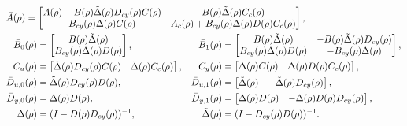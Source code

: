 \documentclass[fleqn,11pt]{article}
\begin{document}
\begin{align*}
    &\bar A(\rho) = \begin{bmatrix}
                A(\rho)+B(\rho)\tilde\Delta(\rho)D_{cy}(\rho)C(\rho) & B(\rho)\tilde\Delta(\rho) C_{c}(\rho)\\
                B_{cy}(\rho)\Delta(\rho)C(\rho) & A_{c}(\rho)+B_{cy}(\rho)\Delta(\rho) D(\rho)C_{c}(\rho)
             \end{bmatrix},\\
    &
    \begin{aligned}
    \bar B_{0}(\rho) &= \begin{bmatrix}
                B(\rho)\tilde\Delta(\rho)\\
                B_{cy}(\rho)\Delta(\rho)D(\rho)
            \end{bmatrix},&
    \bar B_{1}(\rho) &= \begin{bmatrix}
                B(\rho)\tilde\Delta(\rho) & -B(\rho)\tilde\Delta(\rho)D_{cy}(\rho)\\
                B_{cy}(\rho)\Delta(\rho)D(\rho) & -B_{cy}(\rho)\Delta(\rho)
            \end{bmatrix},\\
    \bar C_{u}(\rho) &= \begin{bmatrix}
                \tilde\Delta(\rho)D_{cy}(\rho)C(\rho) & \tilde\Delta(\rho)C_{c}(\rho)\\
            \end{bmatrix},&
    \bar C_{y}(\rho) &= \begin{bmatrix}
                \Delta(\rho)C(\rho) & \Delta(\rho)D(\rho)C_{c}(\rho)\\
            \end{bmatrix},\\
    \bar D_{u,0}(\rho) &= \tilde\Delta(\rho)D_{cy}(\rho)D(\rho),&
    \bar D_{u,1}(\rho) &= \begin{bmatrix}
                \tilde\Delta(\rho) & -\tilde\Delta(\rho)D_{cy}(\rho)\\
            \end{bmatrix},\\
    \bar D_{y,0}(\rho) &= \Delta(\rho)D(\rho),&
    \bar D_{y,1}(\rho) &= \begin{bmatrix}
                \Delta(\rho)D(\rho) & -\Delta(\rho)D(\rho)D_{cy}(\rho)\\
            \end{bmatrix},\\
    \Delta(\rho) &= (I-D(\rho)D_{cy}(\rho))^{-1},& \tilde\Delta(\rho) &= (I-D_{cy}(\rho)D(\rho))^{-1}.
    \end{aligned}
\end{align*}
\end{document}

